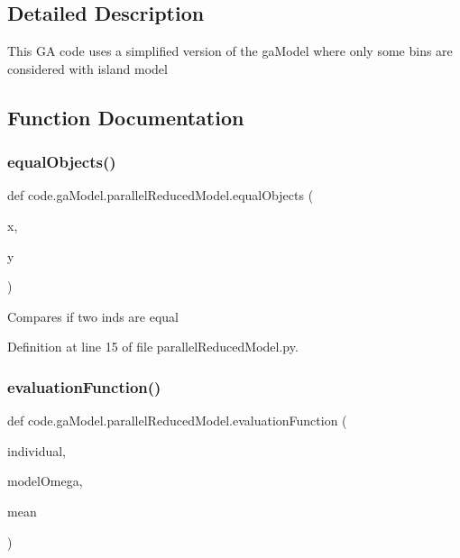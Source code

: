 \subsection{Detailed Description}
\begin{DoxyVerb}This GA code uses a simplified version of the gaModel where only some bins are considered with island model
\end{DoxyVerb}
 

\subsection{Function Documentation}
\mbox{\label{namespacecode_1_1ga_model_1_1parallel_reduced_model_a61e22526caf65f125a0aeaad8e581e6f}} 
\subsubsection{\texorpdfstring{equal\+Objects()}{equalObjects()}}
{\footnotesize\ttfamily def code.\+ga\+Model.\+parallel\+Reduced\+Model.\+equal\+Objects (\begin{DoxyParamCaption}\item[{}]{x,  }\item[{}]{y }\end{DoxyParamCaption})}

\begin{DoxyVerb}Compares if two inds are equal
\end{DoxyVerb}
 

Definition at line 15 of file parallel\+Reduced\+Model.\+py.

\mbox{\label{namespacecode_1_1ga_model_1_1parallel_reduced_model_a7b78703451d4d1110a047a4098ceecea}} 
\subsubsection{\texorpdfstring{evaluation\+Function()}{evaluationFunction()}}
{\footnotesize\ttfamily def code.\+ga\+Model.\+parallel\+Reduced\+Model.\+evaluation\+Function (\begin{DoxyParamCaption}\item[{}]{individual,  }\item[{}]{model\+Omega,  }\item[{}]{mean }\end{DoxyParamCaption})}

